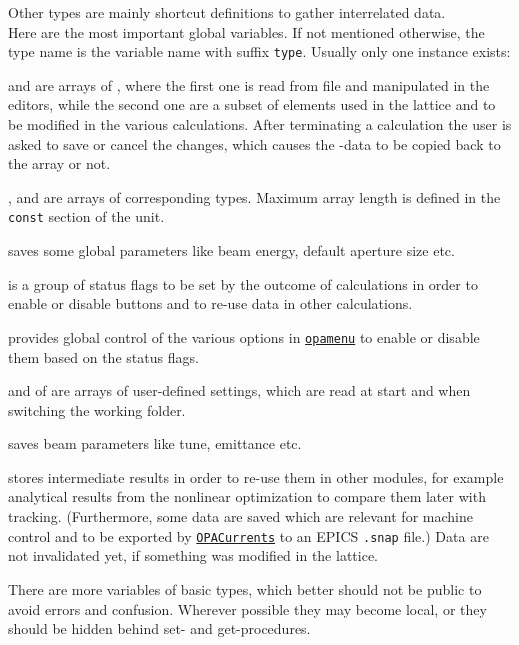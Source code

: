\documentclass[12pt]{article}
\newcommand\code[1]{{\tt #1}}
\newcommand{\unico}[1]{{\color{burntorange}\code{#1}}}
\newcommand{\opagui}[1]{\colorbox{blue!20}{\code{#1}}}
\newcommand{\ogui}[1]{\hyperref[#1]{\opagui{#1}}}
\newcommand{\todo}[1]{{\color{red} #1}}
\begin{document}
{Other types are mainly shortcut definitions to gather interrelated data.\\

Here are the most important global variables. If not mentioned otherwise, the type name is the variable name with suffix \code{type}. Usually only one instance exists:

\unico{Elem} and \unico{Ella} are arrays of \unico{Elementtype}, where the first one is read from file and manipulated in the editors, while the second one are a subset of elements used in the lattice and to be modified in the various calculations. After terminating a calculation the user is asked to save or cancel the changes, which causes the \unico{Ella}-data to be copied back to the \unico{Elem} array or not.

\unico{Segm}, \unico{Lattice} and \unico{Girder} are arrays of corresponding types. Maximum array length is defined in the \code{const} section of the unit.

\unico{Glob} saves some global parameters like beam energy, default aperture size etc.

\unico{Status} is a group of status flags to be set by the outcome of calculations in order to enable or disable buttons and to re-use data in other calculations.

\unico{MainButtonHandles} provides global control of the various options in \ogui{opamenu} to enable or disable them based on the status flags.

\unico{GlobDef} and \unico{Def} of \unico{DefaultType} are arrays of user-defined settings, which are read at start and when switching the working folder. 

\unico{Beam} saves beam parameters like tune, emittance etc.

\unico{SnapSave} stores intermediate results in order to re-use them in other modules, for example analytical results from the nonlinear optimization to compare them later with tracking. (Furthermore, some data are saved which are relevant for machine control and to be exported by \ogui{OPACurrents} to an EPICS \code{.snap} file.) \todo{Data are not invalidated yet, if something was modified in the lattice.}

\todo{There are more variables of basic types, which better should not be public to avoid errors and confusion. Wherever possible they may become local, or they should be hidden behind set- and get-procedures.}

}
\end{document}
